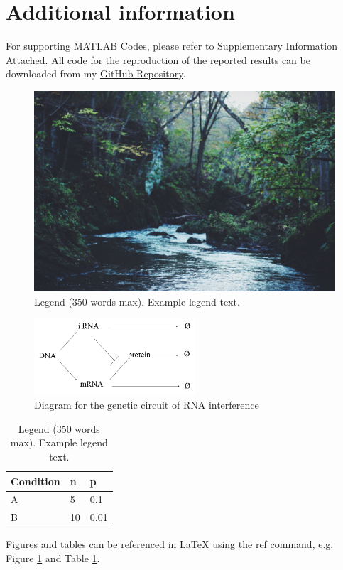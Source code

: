 \documentclass[fleqn,10pt]{wlscirep}
\begin{document}
\section*{Additional information}

For supporting MATLAB Codes, please refer to Supplementary Information Attached. All code for the reproduction of the reported results can be downloaded from my \href{https://github.com/doerlbh/RNAi_CME_Dynamics}{GitHub Repository}.

\begin{figure}[ht]
\centering
\includegraphics[width=\linewidth]{stream}
\caption{Legend (350 words max). Example legend text.}
\label{fig:stream}
\end{figure}

\begin{figure}[ht]
\centering
\includegraphics[width=6cm]{diagram}
\caption{Diagram for the genetic circuit of RNA interference}
\label{fig:diagram}
\end{figure}

\begin{table}[ht]
\centering
\begin{tabular}{|l|l|l|}
\hline
Condition & n & p \\
\hline
A & 5 & 0.1 \\
\hline
B & 10 & 0.01 \\
\hline
\end{tabular}
\caption{\label{tab:example}Legend (350 words max). Example legend text.}
\end{table}

Figures and tables can be referenced in LaTeX using the ref command, e.g. Figure \ref{fig:stream} and Table \ref{tab:example}.
\end{document}
